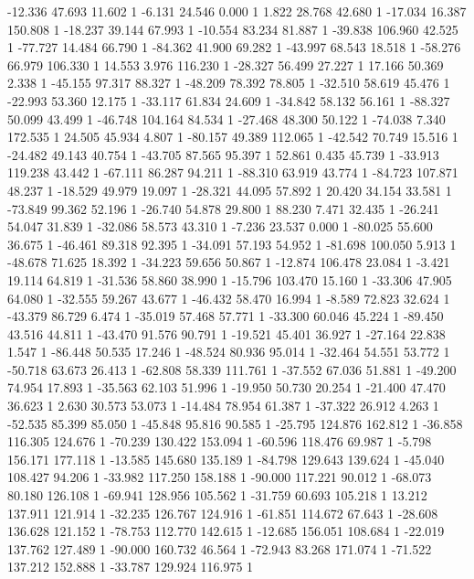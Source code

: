 	-12.336 47.693 11.602 1
	-6.131 24.546 0.000 1
	1.822 28.768 42.680 1
	-17.034 16.387 150.808 1
	-18.237 39.144 67.993 1
	-10.554 83.234 81.887 1
	-39.838 106.960 42.525 1
	-77.727 14.484 66.790 1
	-84.362 41.900 69.282 1
	-43.997 68.543 18.518 1
	-58.276 66.979 106.330 1
	14.553 3.976 116.230 1
	-28.327 56.499 27.227 1
	17.166 50.369 2.338 1
	-45.155 97.317 88.327 1
	-48.209 78.392 78.805 1
	-32.510 58.619 45.476 1
	-22.993 53.360 12.175 1
	-33.117 61.834 24.609 1
	-34.842 58.132 56.161 1
	-88.327 50.099 43.499 1
	-46.748 104.164 84.534 1
	-27.468 48.300 50.122 1
	-74.038 7.340 172.535 1
	24.505 45.934 4.807 1
	-80.157 49.389 112.065 1
	-42.542 70.749 15.516 1
	-24.482 49.143 40.754 1
	-43.705 87.565 95.397 1
	52.861 0.435 45.739 1
	-33.913 119.238 43.442 1
	-67.111 86.287 94.211 1
	-88.310 63.919 43.774 1
	-84.723 107.871 48.237 1
	-18.529 49.979 19.097 1
	-28.321 44.095 57.892 1
	20.420 34.154 33.581 1
	-73.849 99.362 52.196 1
	-26.740 54.878 29.800 1
	88.230 7.471 32.435 1
	-26.241 54.047 31.839 1
	-32.086 58.573 43.310 1
	-7.236 23.537 0.000 1
	-80.025 55.600 36.675 1
	-46.461 89.318 92.395 1
	-34.091 57.193 54.952 1
	-81.698 100.050 5.913 1
	-48.678 71.625 18.392 1
	-34.223 59.656 50.867 1
	-12.874 106.478 23.084 1
	-3.421 19.114 64.819 1
	-31.536 58.860 38.990 1
	-15.796 103.470 15.160 1
	-33.306 47.905 64.080 1
	-32.555 59.267 43.677 1
	-46.432 58.470 16.994 1
	-8.589 72.823 32.624 1
	-43.379 86.729 6.474 1
	-35.019 57.468 57.771 1
	-33.300 60.046 45.224 1
	-89.450 43.516 44.811 1
	-43.470 91.576 90.791 1
	-19.521 45.401 36.927 1
	-27.164 22.838 1.547 1
	-86.448 50.535 17.246 1
	-48.524 80.936 95.014 1
	-32.464 54.551 53.772 1
	-50.718 63.673 26.413 1
	-62.808 58.339 111.761 1
	-37.552 67.036 51.881 1
	-49.200 74.954 17.893 1
	-35.563 62.103 51.996 1
	-19.950 50.730 20.254 1
	-21.400 47.470 36.623 1
	2.630 30.573 53.073 1
	-14.484 78.954 61.387 1
	-37.322 26.912 4.263 1
	-52.535 85.399 85.050 1
	-45.848 95.816 90.585 1
	-25.795 124.876 162.812 1
	-36.858 116.305 124.676 1
	-70.239 130.422 153.094 1
	-60.596 118.476 69.987 1
	-5.798 156.171 177.118 1
	-13.585 145.680 135.189 1
	-84.798 129.643 139.624 1
	-45.040 108.427 94.206 1
	-33.982 117.250 158.188 1
	-90.000 117.221 90.012 1
	-68.073 80.180 126.108 1
	-69.941 128.956 105.562 1
	-31.759 60.693 105.218 1
	13.212 137.911 121.914 1
	-32.235 126.767 124.916 1
	-61.851 114.672 67.643 1
	-28.608 136.628 121.152 1
	-78.753 112.770 142.615 1
	-12.685 156.051 108.684 1
	-22.019 137.762 127.489 1
	-90.000 160.732 46.564 1
	-72.943 83.268 171.074 1
	-71.522 137.212 152.888 1
	-33.787 129.924 116.975 1
